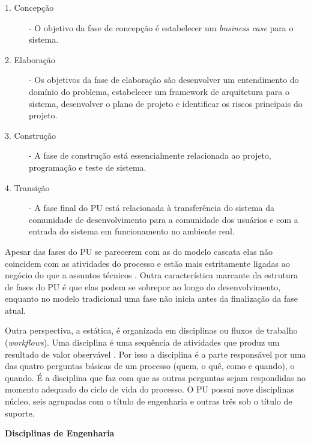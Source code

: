 \documentclass[
	article,			%
	11pt,				%
	oneside,			%
	a4paper,			%
	english,			%
	brazil,				%
	sumario=tradicional
	]{abntex2}
\begin{document}
\begin{description}
   \item[1. Concepção] - O objetivo da fase de concepção é estabelecer um
   \textit{business case} para o sistema.
   \item[2. Elaboração] - Os objetivos da fase de elaboração são desenvolver um
   entendimento do domínio do problema, estabelecer um framework de arquitetura
   para o sistema, desenvolver o plano de projeto e identificar os riscos
   principais do projeto.
   \item[3. Construção] - A fase de construção está essencialmente relacionada
   ao projeto, programação e teste de sistema.
   \item[4. Transição] - A fase final do PU está relacionada à transferência do
   sistema da comunidade de desenvolvimento para a comunidade dos usuários e com
   a entrada do sistema em funcionamento no ambiente real.
\end{description}

Apesar das fases do PU se parecerem com as do modelo cascata elas não coincidem
com as atividades do processo e estão mais estritamente ligadas ao negócio do
que a assuntos técnicos \cite{sommerville2007}. Outra característica marcante
da estrutura de fases do PU é que elas podem se sobrepor ao longo do
desenvolvimento, enquanto no modelo tradicional uma fase não inicia antes da
finalização da fase atual.

Outra perspectiva, a estática, é organizada em disciplinas ou fluxos de trabalho
(\textit{workflows}). Uma disciplina é uma sequência de atividades que produz um
resultado de valor observável \cite{Corporation1998}. Por isso a disciplina é a
parte responsável por uma das quatro perguntas básicas de um processo (quem, o
quê, como e quando), o quando. É a disciplina que faz com que as outras
perguntas sejam respondidas no momento adequado do ciclo de vida do processo. O
PU possui nove disciplinas núcleo, seis agrupadas com o título de engenharia e
outras três sob o título de suporte.

\textbf{Disciplinas de Engenharia}
\end{document}
